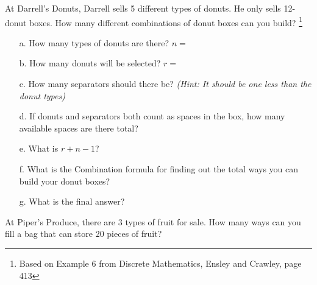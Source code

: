     \begin{questionNOGRADE}{\thequestion}
        At Darrell's Donuts, Darrell sells 5 different types of donuts.
        He only sells 12-donut boxes. How many different combinations
        of donut boxes can you build?
        \footnote{Based on Example 6 from Discrete Mathematics, Ensley and Crawley, page 413}

        \begin{enumerate}
            \item[a.]   How many types of donuts are there? $n =$
            \item[b.]   How many donuts will be selected? $r = $
            \item[c.]   How many separators should there be?
                        \textit{(Hint: It should be one less than the donut types)}
            \item[d.]   If donuts and separators both count as spaces in the box,
                        how many available spaces are there total?
            \item[e.]   What is $r + n - 1$?
            \item[f.]   What is the Combination formula for finding out the total ways you can build your donut boxes?
            \item[g.]   What is the final answer?
        \end{enumerate}
    \end{questionNOGRADE}

    \hrulefill

    \begin{questionNOGRADE}{\thequestion}
        At Piper's Produce, there are 3 types of fruit for sale.
        How many ways can you fill a bag that can store 20 pieces of fruit?
    \end{questionNOGRADE}



